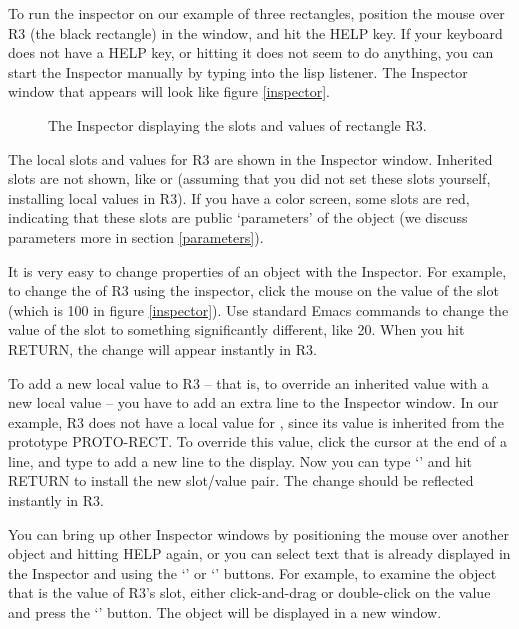 To run the inspector on our example of three rectangles, position the mouse
over R3 (the black rectangle) in the window, and hit the HELP key.  If your
keyboard does not have a HELP key, or hitting it does not seem to do anything,
you can start the Inspector manually by typing  into
the lisp listener.  The Inspector window that appears will look like figure
\ref{inspector}.

\begin{figure}
\begin{center}
\end{center}
\caption{The Inspector displaying the slots and values of rectangle R3.}
\end{figure}

The local slots and values for R3 are shown in the Inspector window.
Inherited slots are not shown, like  or  (assuming
that you did not set these slots yourself, installing local values in R3).
If you have a color screen, some slots are red, indicating that these slots
are public `parameters' of the object (we discuss parameters more in
section \ref{parameters}).

It is very easy to change properties of an object with the Inspector.  For
example, to change the  of R3 using the inspector, click the mouse
on the value of the  slot (which is 100 in figure \ref{inspector}).
Use standard Emacs commands to change the value of the slot to something
significantly different, like 20.  When you hit RETURN, the change will appear
instantly in R3.

To add a new local value to R3 -- that is, to override an inherited value with
a new local value -- you have to add an extra line to the Inspector window.
In our example, R3 does not have a local value for , since its
value is inherited from the prototype PROTO-RECT.  To override this value,
click the cursor at the end of a line, and type  to add a new line
to the display.  Now you can type `' and hit RETURN to
install the new slot/value pair.  The change should be reflected instantly
in R3.

You can bring up other Inspector windows by positioning the mouse over another
object and hitting HELP again, or you can select text that is already displayed
in the Inspector and using the `' or `'
buttons.  For example, to examine the  object that is the
value of R3's  slot, either click-and-drag or double-click
on the  value and press the `' button.
The object will be displayed in a new window.

